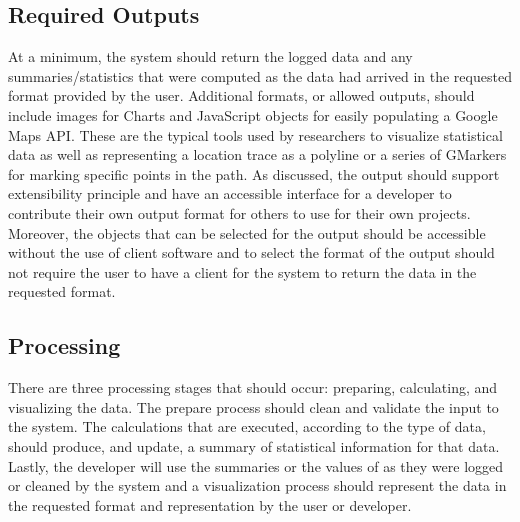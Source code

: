 \documentclass[10pt,a4paper,english]{article}
\begin{document}

\hypertarget{required-outputs}{}
\subsection*{Required Outputs}
\label{required-outputs}

At a minimum, the system should return the logged data and any summaries/statistics that were computed as the data had arrived in the requested format provided by the user. Additional formats, or allowed outputs, should include images for Charts and JavaScript objects for easily populating a Google Maps API. These are the typical tools used by researchers to visualize statistical data as well as representing a location trace as a polyline or a series of GMarkers for marking specific points in the path. As discussed, the output should support extensibility principle and have an accessible interface for a developer to contribute their own output format for others to use for their own projects. Moreover, the objects that can be selected for the output should be accessible without the use of client software and to select the format of the output should not require the user to have a client for the system to return the data in the requested format.



\hypertarget{processing}{}
\subsection*{Processing}
\label{processing}

There are three processing stages that should occur: preparing, calculating, and visualizing the data. The prepare process should clean and validate the input to the system. The calculations that are executed, according to the type of data, should produce, and update, a summary of statistical information for that data. Lastly, the developer will use the summaries or the values of as they were logged or cleaned by the system and a visualization process should represent the data in the requested format and representation by the user or developer.


\end{document}
